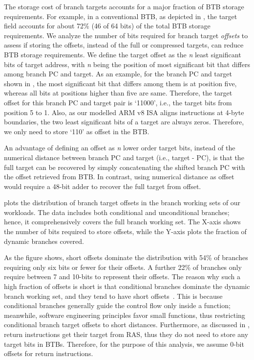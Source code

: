 The storage cost of branch targets accounts for a major fraction of BTB storage requirements. For example, in a conventional BTB, as depicted in , the target field accounts for about 72\% (46 of 64 bits) of the total BTB storage requirements. We analyze the number of bits required for branch target \emph{offsets} to assess if storing the offsets, instead of the full or compressed targets, can reduce BTB storage requirements. We define the target offset as the \textit{n} least significant bits of target address, with \textit{n} being the position of most significant bit that differs among branch PC and target. As an example, for the branch PC and target shown in , the most significant bit that differs among them is at position five, whereas all bits at positions higher than five are same. Therefore, the target offset for this branch PC and target pair is `11000', i.e., the target bits from position 5 to 1. Also, as our modelled ARM v8 ISA aligns instructions at 4-byte boundaries, the two least significant bits of a target are always zeros. Therefore, we only need to store `110' as offset in the BTB.


An advantage of defining an offset as \textit{n} lower order target bits, instead of the numerical distance between branch PC and target (i.e., target - PC), is that the full target can be recovered by simply concatenating the shifted branch PC with the offset retrieved from BTB. In contrast, using numerical distance as offset would require a 48-bit adder to recover the full target from offset. 

 plots the distribution of branch target offsets in the branch working sets of our workloads. The data includes both conditional and unconditional branches; hence, it comprehensively covers the full branch working set. The X-axis shows the number of bits required to store offsets, while the Y-axis plots the fraction of dynamic branches covered.

As the figure shows, short offsets dominate the distribution with 54\% of branches requiring only six bits or fewer for their offsets. A further 22\% of branches only require between 7 and 10-bits to represent their offsets. The reason why such a high fraction of offsets is short is that conditional branches dominate the dynamic branch working set, and they tend to have short offsets~\cite{boomerang}. This is because conditional branches generally guide the control flow only inside a function; meanwhile, software engineering principles favor small functions, thus restricting conditional branch target offsets to short distances. Furthermore, as discussed in , return instructions get their target from RAS, thus they do not need to store any target bits in BTBs. Therefore, for the purpose of this analysis, we assume 0-bit offsets for return instructions.


